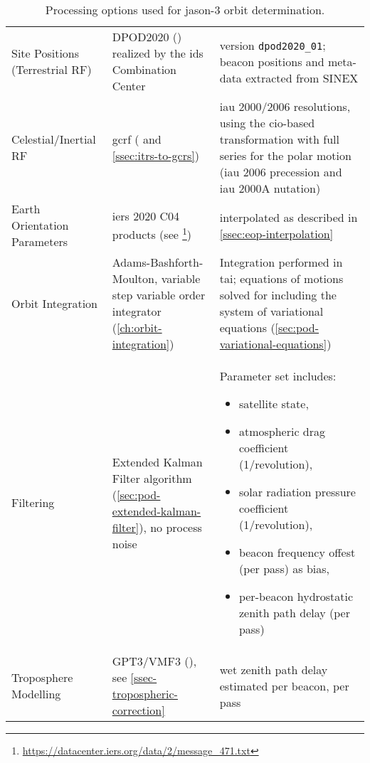 \begin{landscape}
\begin{table}[h!]
{\begin{tabularx}{\hsize}{p{3cm}XX}
        Site Positions \newline (Terrestrial RF) & DPOD2020 (\cite{Moreaux2023}) realized by the \gls{ids} Combination Center & version \texttt{dpod2020\_01}; beacon positions and meta-data extracted from SINEX \\
        Celestial/Inertial RF & \gls{gcrf} (\cite{iers2010} and \autoref{ssec:itrs-to-gcrs}) & \gls{iau} 2000/2006 resolutions, using the \gls{cio}-based transformation with full series for the polar motion (\gls{iau} 2006 precession and \gls{iau} 2000A nutation) \\
        Earth Orientation \newline Parameters & \gls{iers} 2020 C04 products (see \footnote{\url{https://datacenter.iers.org/data/2/message_471.txt}}) & interpolated as described in \autoref{ssec:eop-interpolation} \\
        Orbit Integration & Adams-Bashforth-Moulton, variable step variable order integrator (\autoref{ch:orbit-integration}) & Integration performed in \gls{tai}; equations of motions solved for including the system of variational equations (\autoref{sec:pod-variational-equations}) \\
        Filtering & Extended Kalman Filter algorithm (\autoref{sec:pod-extended-kalman-filter}), no process noise & Parameter set includes: 
        \begin{itemize}[topsep=0pt,partopsep=0pt,itemsep=1pt,parsep=1pt]
          \item[] satellite state, 
          \item[] atmospheric drag coefficient (1/\si{revolution}),
          \item[] solar radiation pressure coefficient (1/\si{revolution}),
          \item[] beacon frequency offest (per pass) as bias,
          \item[] per-beacon hydrostatic zenith path delay (per pass)
        \end{itemize} \\
        Troposphere Modelling & GPT3/VMF3 (\cite{Landskron2018}), see \autoref{ssec-tropospheric-correction} & wet zenith path delay estimated per beacon, per pass\\
       \bottomrule
    \end{tabularx}}
    \caption{Processing options used for \gls{jason}-3 orbit determination.}
    \label{table:processing-options}
\end{table}
\end{landscape}

